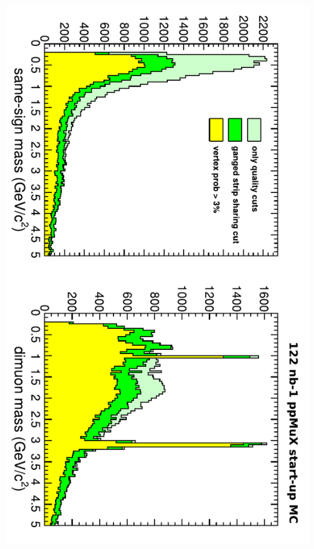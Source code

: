 \documentclass[compress]{beamer}
\begin{document}
\begin{frame}
\begin{columns}
\includegraphics[height=\linewidth, angle=90]{gangedstripcut_mass_MC.pdf}
\end{columns}
\end{frame}
\end{document}
